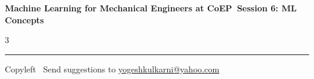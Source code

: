 \documentclass[8pt,landscape]{article}
\begin{document}
\footnotesize

\begin{center}
\Large{\textbf{Machine Learning for Mechanical Engineers at CoEP\ Session 6: ML Concepts}}
\end{center}

\begin{multicols}{3}

\end{multicols}

\rule{\linewidth}{0.25pt}
\scriptsize
Copyleft \textcopyleft\  Send suggestions to
\href{http://www.yogeshkulkarni.com}{yogeshkulkarni@yahoo.com}
\end{document}
